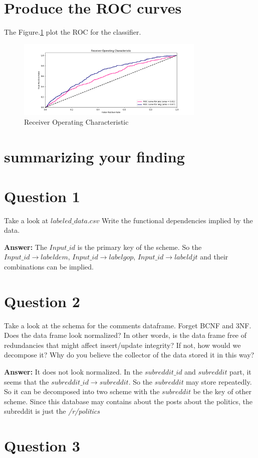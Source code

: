 \documentclass[12pt]{article}
\begin{document}
\section{Produce the ROC curves}
The Figure.\ref{fig:7} plot the ROC for the classifier.
\begin{figure}[!h]
     \begin{center}
                  \includegraphics[width=0.8\textwidth]{../plots/part7.png}
    \end{center}
    \caption{%
       Receiver Operating Characteristic
     }%
   \label{fig:7}
\end{figure}


 
\section {summarizing your finding}
\section {Question 1}
Take a look at $labeled\_data.csv$ Write the functional dependencies implied by the data.

\textbf {Answer:} The $Input\_id$ is the primary key of the scheme. So the $Input\_id \to labeldem$,  $Input\_id \to labelgop$, $Input\_id \to labeldjt$ and their combinations can be implied. 
\section {Question 2}
Take a look at the schema for the comments dataframe. Forget BCNF and 3NF. Does the data frame look normalized? In other words, is the data frame free of redundancies that might affect insert/update integrity? If not, how would we decompose it? Why do you believe the collector of the data stored it in this way?

\textbf{Answer:} It does not look normalized. In the $subreddit\_id$ and $subreddit$ part, it seems that the  $subreddit\_id \to subreddit$. So the $subreddit$ may store repeatedly. So it can be decomposed into two scheme with the $subreddit$ be the key of other scheme. Since this database may contains about the posts about the politics, the subreddit is just the \textit{/r/politics}


\section {Question 3}
 
\end{document}
